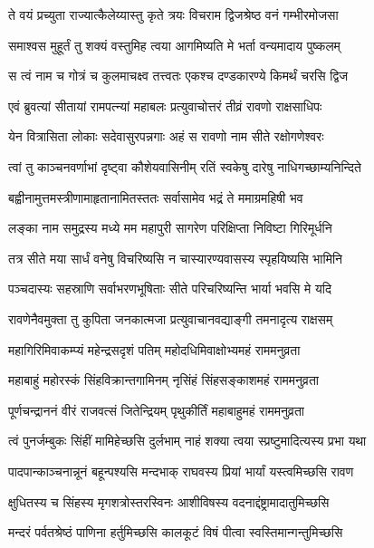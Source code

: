 \twolineshloka
{ते वयं प्रच्युता राज्यात्कैलेय्यास्तु कृते त्रयः}
{विचराम द्विजश्रेष्ठ वनं गम्भीरमोजसा} %

\twolineshloka
{समाश्वस मुहूर्तं तु शक्यं वस्तुमिह त्वया}
{आगमिष्यति मे भर्ता वन्यमादाय पुष्कलम्} %

\twolineshloka
{स त्वं नाम च गोत्रं च कुलमाचक्ष्व तत्त्वतः}
{एकश्च दण्डकारण्ये किमर्थं चरसि द्विज} %

\twolineshloka
{एवं ब्रुवत्यां सीतायां रामपत्न्यां महाबलः}
{प्रत्युवाचोत्तरं तीव्रं रावणो राक्षसाधिपः} %

\twolineshloka
{येन वित्रासिता लोकाः सदेवासुरपन्नगाः}
{अहं स रावणो नाम सीते रक्षोगणेश्वरः} %

\twolineshloka
{त्वां तु काञ्चनवर्णाभां दृष्ट्वा कौशेयवासिनीम्}
{रतिं स्वकेषु दारेषु नाधिगच्छाम्यनिन्दिते} %

\twolineshloka
{बह्वीनामुत्तमस्त्रीणामाहृतानामितस्ततः}
{सर्वासामेव भद्रं ते ममाग्रमहिषी भव} %

\twolineshloka
{लङ्का नाम समुद्रस्य मध्ये मम महापुरी}
{सागरेण परिक्षिप्ता निविष्टा गिरिमूर्धनि} %

\twolineshloka
{तत्र सीते मया सार्धं वनेषु विचरिष्यसि}
{न चास्यारण्यवासस्य स्पृहयिष्यसि भामिनि} %

\twolineshloka
{पञ्चदास्यः सहस्राणि सर्वाभरणभूषिताः}
{सीते परिचरिष्यन्ति भार्या भवसि मे यदि} %

\twolineshloka
{रावणेनैवमुक्ता तु कुपिता जनकात्मजा}
{प्रत्युवाचानवद्याङ्गी तमनादृत्य राक्षसम्} %

\twolineshloka
{महागिरिमिवाकम्प्यं महेन्द्रसदृशं पतिम्}
{महोदधिमिवाक्षोभ्यमहं राममनुव्रता} %

\twolineshloka
{महाबाहुं महोरस्कं सिंहविक्रान्तगामिनम्}
{नृसिंहं सिंहसङ्काशमहं राममनुव्रता} %

\twolineshloka
{पूर्णचन्द्राननं वीरं राजवत्सं जितेन्द्रियम्}
{पृथुकीर्तिं महाबाहुमहं राममनुव्रता} %

\twolineshloka
{त्वं पुनर्जम्बुकः सिंहीं मामिहेच्छसि दुर्लभाम्}
{नाहं शक्या त्वया स्प्रष्टुमादित्यस्य प्रभा यथा} %

\twolineshloka
{पादपान्काञ्चनान्नूनं बहून्पश्यसि मन्दभाक्}
{राघवस्य प्रियां भार्यां यस्त्वमिच्छसि रावण} %

\twolineshloka
{क्षुधितस्य च सिंहस्य मृगशत्रोस्तरस्विनः}
{आशीविषस्य वदनाद्दंष्ट्रामादातुमिच्छसि} %

\twolineshloka
{मन्दरं पर्वतश्रेष्ठं पाणिना हर्तुमिच्छसि}
{कालकूटं विषं पीत्वा स्वस्तिमान्गन्तुमिच्छसि} %

